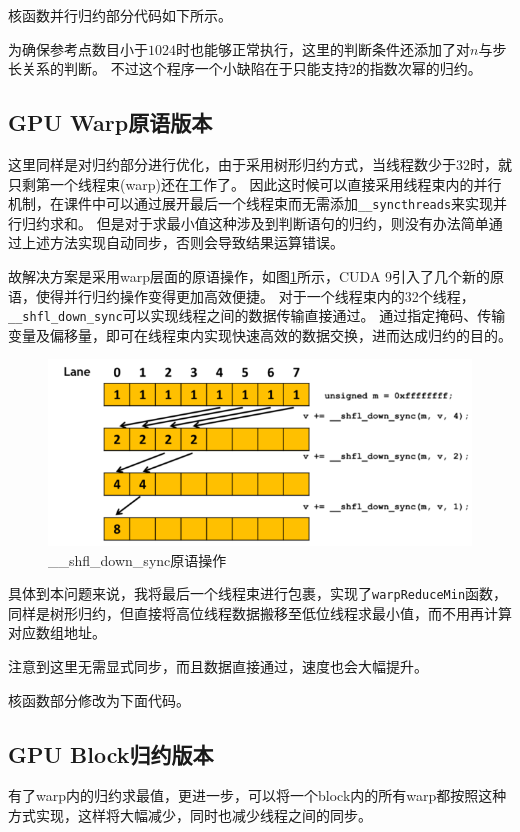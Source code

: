 \documentclass[logo,reportComp]{thesis}
\def\sharedmem{\textcolor{red}{\kaiti 共享内存}}
\def\register{\textcolor{orange}{\kaiti 寄存器}}
\begin{document}
核函数并行归约部分代码如下所示。

为确保参考点数目小于$1024$时也能够正常执行，这里的判断条件还添加了对$n$与步长关系的判断。
不过这个程序一个小缺陷在于只能支持$2$的指数次幂的归约。

\subsection{GPU Warp原语版本}
这里同样是对归约部分进行优化，由于采用树形归约方式，当线程数少于$32$时，就只剩第一个线程束(warp)还在工作了。
因此这时候可以直接采用线程束内的并行机制，在课件中可以通过展开最后一个线程束而无需添加\verb'__syncthreads'来实现并行归约求和。
但是对于求最小值这种涉及到判断语句的归约，则没有办法简单通过上述方法实现自动同步，否则会导致结果运算错误。

故解决方案是采用warp层面的原语操作，如图\ref{fig:shfl_down}所示，CUDA 9引入了几个新的原语，使得并行归约操作变得更加高效便捷。
对于一个线程束内的32个线程，\verb'__shfl_down_sync'可以实现线程之间的数据传输直接通过。
通过指定掩码、传输变量及偏移量，即可在线程束内实现快速高效的数据交换，进而达成归约的目的。
\begin{figure}[H]
\centering
\includegraphics[width=0.8\linewidth]{fig/reduce_shfl_down.png}
\caption{\_\_shfl\_down\_sync原语操作}
\label{fig:shfl_down}
\end{figure}

具体到本问题来说，我将最后一个线程束进行包裹，实现了\verb'warpReduceMin'函数，同样是树形归约，但直接将高位线程数据搬移至低位线程求最小值，而不用再计算对应数组地址。


注意到这里无需显式同步，而且数据直接通过，速度也会大幅提升。

核函数部分修改为下面代码。


\subsection{GPU Block归约版本}
有了warp内的归约求最值，更进一步，可以将一个block内的所有warp都按照这种方式实现，这样将大幅减少，同时也减少线程之间的同步。
\end{document}
